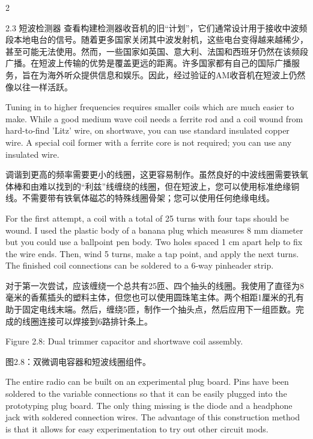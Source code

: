 \documentclass{ctexbook}
\begin{document}
\begin{paracol}{2}
\switchcolumn

2.3 短波检测器
查看构建检测器收音机的旧“计划”，它们通常设计用于接收中波频段本地电台的信号。随着更多国家关闭其中波发射机，这些电台变得越来越稀少，甚至可能无法使用。然而，一些国家如英国、意大利、法国和西班牙仍然在该频段广播。在短波上传输的优势是覆盖更远的距离。许多国家都有自己的国际广播服务，旨在为海外听众提供信息和娱乐。因此，经过验证的AM收音机在短波上仍然像以往一样活跃。

\switchcolumn*

Tuning in to higher frequencies requires smaller coils which are much easier to make. While 
a good medium wave coil needs a ferrite rod and a coil wound from hard-to-find 'Litz' wire, 
on shortwave, you can use standard insulated copper wire. A special coil former with a 
ferrite core is not required; you can use any insulated wire. 

\switchcolumn

调谐到更高的频率需要更小的线圈，这更容易制作。虽然良好的中波线圈需要铁氧体棒和由难以找到的“利兹”线缠绕的线圈，但在短波上，您可以使用标准绝缘铜线。不需要带有铁氧体磁芯的特殊线圈骨架；您可以使用任何绝缘电线。

\switchcolumn*

For the first attempt, a coil with a total of 25 turns with four taps should be wound. I used 
the plastic body of a banana plug which measures 8 mm diameter but you could use a ballpoint pen body. Two holes spaced 1 cm apart help to fix the wire ends. Then, wind 5 turns, 
make a tap point, and apply the next turns. The finished coil connections can be soldered 
to a 6-way pinheader strip.

\switchcolumn

对于第一次尝试，应该缠绕一个总共有25匝、四个抽头的线圈。我使用了直径为8毫米的香蕉插头的塑料主体，但您也可以使用圆珠笔主体。两个相距1厘米的孔有助于固定电线末端。然后，缠绕5匝，制作一个抽头点，然后应用下一组匝数。完成的线圈连接可以焊接到6路排针条上。

\switchcolumn*

Figure 2.8: Dual trimmer capacitor and shortwave coil assembly. 

\switchcolumn

图2.8：双微调电容器和短波线圈组件。

\switchcolumn*

The entire radio can be built on an experimental plug board. Pins have been soldered to the 
variable connections so that it can be easily plugged into the prototyping plug board. The 
only thing missing is the diode and a headphone jack with soldered connection wires. The 
advantage of this construction method is that it allows for easy experimentation to try out 
other circuit mods. 


\end{paracol}
\end{document}
